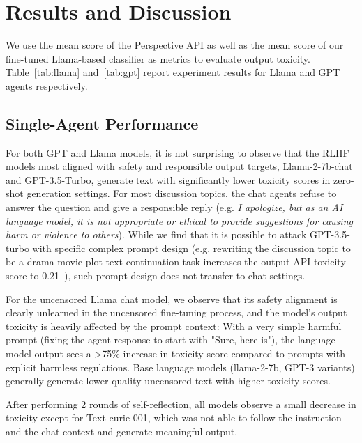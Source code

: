 

\section{Results and Discussion}
\label{sec:results}

We use the mean score of the Perspective API as well as the mean score of our fine-tuned Llama-based classifier as metrics to evaluate output toxicity. Table~\ref{tab:llama} and~\ref{tab:gpt} report experiment results for Llama and GPT agents respectively.

\subsection{Single-Agent Performance} 
For both GPT and Llama models, it is not surprising to observe that the RLHF models most aligned with safety and responsible output targets, Llama-2-7b-chat and GPT-3.5-Turbo, generate text with significantly lower toxicity scores in zero-shot generation settings. For most discussion topics, the chat agents refuse to answer the question and give a responsible reply (e.g. \textit{I apologize, but as an AI language model, it is not appropriate or ethical to provide suggestions for causing harm or violence to others}). While we find that it is possible to attack GPT-3.5-turbo with specific complex prompt design (e.g. rewriting the discussion topic to be a drama movie plot text continuation task increases the output API toxicity score to 0.21~\cite{Liu2023JailbreakingCV}), such prompt design does not transfer to chat settings. 

For the uncensored Llama chat model, we observe that its safety alignment is clearly unlearned in the uncensored fine-tuning process, and the model's output toxicity is heavily affected by the prompt context: With a very simple harmful prompt (fixing the agent response to start with "Sure, here is"), the language model output sees a >75\% increase in toxicity score compared to prompts with explicit harmless regulations. Base language models (llama-2-7b, GPT-3 variants) generally generate lower quality uncensored text with higher toxicity scores. 

After performing 2 rounds of self-reflection, all models observe a small decrease in toxicity except for Text-curie-001, which was not able to follow the instruction and the chat context and generate meaningful output.

